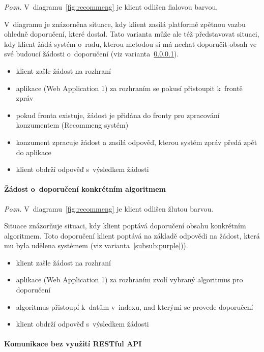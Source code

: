 \documentclass[thesis=M,czech]{FITthesis}[2014/05/07]
\begin{document}
\emph{Pozn.} V~diagramu~\ref{fig:recommeng} je klient odlišen fialovou barvou.

V~diagramu je znázorněna situace, kdy klient zasílá platformě zpětnou vazbu ohledně doporučení, které dostal. Tato varianta může ale též představovat situaci, kdy klient žádá systém o~radu, kterou metodou si má nechat doporučit obsah ve své budoucí žádosti o~doporučení (viz varianta~\ref{subsub:yellow}).

\begin{itemize}
	\item klient zašle žádost na rozhraní
	\item aplikace (Web Application 1) za rozhraním se pokusí přistoupit k~frontě zpráv
	\item pokud fronta existuje, žádost je přidána do fronty pro zpracování konzumentem (Recommeng systém)
	\item konzument zpracuje žádost a zasílá odpověď, kterou systém zpráv předá zpět do aplikace
	\item klient obdrží odpověď s~výsledkem žádosti
\end{itemize}

\paragraph{Žádost o~doporučení konkrétním algoritmem}
\label{subsub:yellow}

\emph{Pozn.} V~diagramu~\ref{fig:recommeng} je klient odlišen žlutou barvou.

Situace znázorňuje situaci, kdy klient poptává doporučení obsahu konkrétním algoritmem. Toto doporučení klient poptává na základě odpovědi na žádost, která mu byla udělena systémem (viz varianta~\ref{subsub:purple})). 

\begin{itemize}
	\item klient zašle žádost na rozhraní
	\item aplikace (Web Application 1) za rozhraním zvolí vybraný algoritmus pro doporučení
	\item algoritmus přistoupí k~datům v~indexu, nad kterými se provede doporučení
	\item klient obdrží odpověď s~výsledkem žádosti
\end{itemize}

\paragraph{Komunikace bez využití RESTful API}
\end{document}
